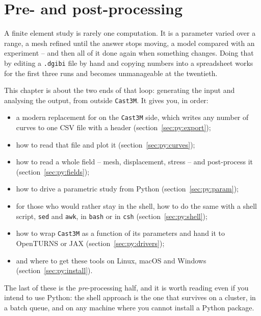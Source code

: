 \chapter{Pre- and post-processing}
\label{chap:python}


%
%
A finite element study is rarely one computation. It is a parameter varied
over a range, a mesh refined until the answer stops moving, a model compared
with an experiment -- and then all of it done again when something changes.
Doing that by editing a \texttt{.dgibi} file by hand and copying numbers into
a spreadsheet works for the first three runs and becomes unmanageable at the
twentieth.

This chapter is about the two ends of that loop: generating the input and
analysing the output, from outside \texttt{Cast3M}. It gives you, in order:

\begin{itemize}
\item a modern replacement for  on the \texttt{Cast3M} side, which
  writes any number of curves to one CSV file with a header
  (section~\ref{sec:py:export});
\item how to read that file and plot it (section~\ref{sec:py:curves});
\item how to read a whole field -- mesh, displacement, stress -- and
  post-process it (section~\ref{sec:py:fields});
\item how to drive a parametric study from Python
  (section~\ref{sec:py:param});
\item for those who would rather stay in the shell, how to do the same
  with a shell script, \texttt{sed} and \texttt{awk}, in \texttt{bash} or in
  \texttt{csh} (section~\ref{sec:py:shell});
\item how to wrap \texttt{Cast3M} as a function of its parameters and hand
  it to OpenTURNS or JAX (section~\ref{sec:py:drivers});
\item and where to get these tools on Linux, macOS and Windows
  (section~\ref{sec:py:install}).
\end{itemize}

\noindent The last of these is the \emph{pre}-processing half, and it is
worth reading even if you intend to use Python: the shell approach is the one
that survives on a cluster, in a batch queue, and on any machine where you
cannot install a Python package.

